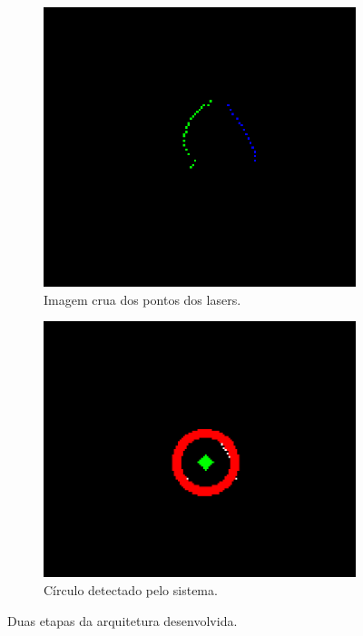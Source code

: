 \documentclass[acronym, symbols, table]{fei}
\begin{document}
				\begin{figure}[!h]
					\centering
					\begin{subfigure}[t]{0.38\textwidth}
						\centering
						\includegraphics[width=\textwidth]{raw_lidars_image.png}
						\caption{Imagem crua dos pontos dos lasers.} \label{fig:raw_image}
					\end{subfigure}%
					\hspace{1em}
					\begin{subfigure}[t]{0.415\textwidth}
						\centering
						\includegraphics[width=\textwidth]{robot_detected_image.png}
						\caption{Círculo detectado pelo sistema.} \label{fig:robot_detected}
					\end{subfigure}
					
					\caption{Duas etapas da arquitetura desenvolvida.}
					\label{fig:robot_detection}
				\end{figure}
			
\end{document}

